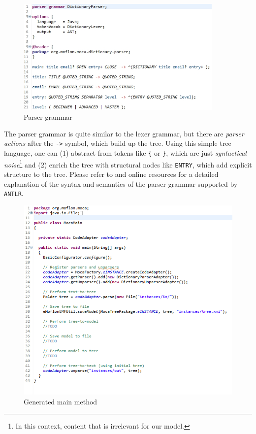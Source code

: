 \begin{figure}[!htbp]
\begin{center}
 \includegraphics[width=0.9\textwidth]{pics/moca/2TextToMocaTree/7-parser}
  \caption{Parser grammar}
  \label{fig:moca-7-parser}
\end{center}
\end{figure}
The parser grammar is quite similar to the lexer grammar, but there are \emph{parser actions} after the \texttt{->} symbol, which build up the tree.
Using this simple tree language, one can (1) abstract from tokens like \texttt{\{} or \texttt{\}}, which are just \emph{syntactical noise}\footnote{In this context, content that is irrelevant for our model.} and (2) enrich the tree with structural nodes like \texttt{ENTRY}, which add explicit structure to the tree.
Please refer to \cite{ANTLR} and online resources for a detailed explanation of the syntax and semantics of the parser grammar supported by \texttt{ANTLR}. 
 
\begin{figure}[htp]
\begin{center}
 \includegraphics[width=\textwidth]{pics/moca/2TextToMocaTree/8-MocaMain}
  \caption{Generated main method}
  \label{fig:moca-8-MocaMain} 
\end{center}
\end{figure}

